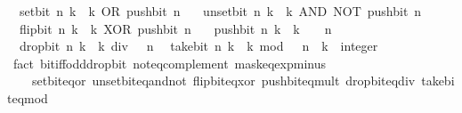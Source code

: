 \begin{isabellebody}
\ \ {\isacartoucheopen}set{\isacharunderscore}{\kern0pt}bit\ n\ k\ {\isacharequal}{\kern0pt}\ k\ OR\ push{\isacharunderscore}{\kern0pt}bit\ n\ {}{\isacartoucheclose}\isanewline
\ \ {\isacartoucheopen}unset{\isacharunderscore}{\kern0pt}bit\ n\ k\ {\isacharequal}{\kern0pt}\ k\ AND\ NOT\ {\isacharparenleft}{\kern0pt}push{\isacharunderscore}{\kern0pt}bit\ n\ {}{\isacharparenright}{\kern0pt}{\isacartoucheclose}\isanewline
\ \ {\isacartoucheopen}flip{\isacharunderscore}{\kern0pt}bit\ n\ k\ {\isacharequal}{\kern0pt}\ k\ XOR\ push{\isacharunderscore}{\kern0pt}bit\ n\ {}{\isacartoucheclose}\isanewline
\ \ {\isacartoucheopen}push{\isacharunderscore}{\kern0pt}bit\ n\ k\ {\isacharequal}{\kern0pt}\ k\ {\isacharasterisk}{\kern0pt}\ {}\ {\isacharcircum}{\kern0pt}\ n{\isacartoucheclose}\isanewline
\ \ {\isacartoucheopen}drop{\isacharunderscore}{\kern0pt}bit\ n\ k\ {\isacharequal}{\kern0pt}\ k\ div\ {}\ {\isacharcircum}{\kern0pt}\ n{\isacartoucheclose}\isanewline
\ \ {\isacartoucheopen}take{\isacharunderscore}{\kern0pt}bit\ n\ k\ {\isacharequal}{\kern0pt}\ k\ mod\ {}\ {\isacharcircum}{\kern0pt}\ n{\isacartoucheclose}\ \ k\ {\isacharcolon}{\kern0pt}{\isacharcolon}{\kern0pt}\ integer\isanewline
%
\isadelimproof
\ \ %
\endisadelimproof
%
\isatagproof
{}\isamarkupfalse%
\ {\isacharparenleft}{\kern0pt}fact\ bit{\isacharunderscore}{\kern0pt}iff{\isacharunderscore}{\kern0pt}odd{\isacharunderscore}{\kern0pt}drop{\isacharunderscore}{\kern0pt}bit\ not{\isacharunderscore}{\kern0pt}eq{\isacharunderscore}{\kern0pt}complement\ mask{\isacharunderscore}{\kern0pt}eq{\isacharunderscore}{\kern0pt}exp{\isacharunderscore}{\kern0pt}minus{\isacharunderscore}{\kern0pt}{}\isanewline
\ \ \ \ set{\isacharunderscore}{\kern0pt}bit{\isacharunderscore}{\kern0pt}eq{\isacharunderscore}{\kern0pt}or\ unset{\isacharunderscore}{\kern0pt}bit{\isacharunderscore}{\kern0pt}eq{\isacharunderscore}{\kern0pt}and{\isacharunderscore}{\kern0pt}not\ flip{\isacharunderscore}{\kern0pt}bit{\isacharunderscore}{\kern0pt}eq{\isacharunderscore}{\kern0pt}xor\ push{\isacharunderscore}{\kern0pt}bit{\isacharunderscore}{\kern0pt}eq{\isacharunderscore}{\kern0pt}mult\ drop{\isacharunderscore}{\kern0pt}bit{\isacharunderscore}{\kern0pt}eq{\isacharunderscore}{\kern0pt}div\ take{\isacharunderscore}{\kern0pt}bit{\isacharunderscore}{\kern0pt}eq{\isacharunderscore}{\kern0pt}mod{\isacharparenright}{\kern0pt}{\isacharplus}{\kern0pt}%
\endisatagproof
{\isafoldproof}%
%
\isadelimproof
\isanewline
%
\endisadelimproof
\isanewline
{}\isamarkupfalse%

\end{isabellebody}
